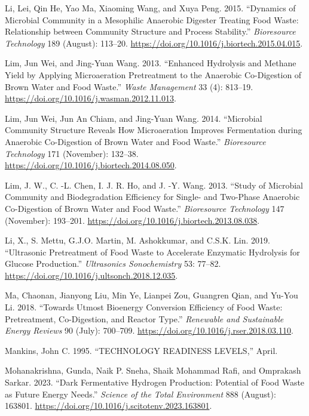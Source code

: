 \documentclass[11pt]{report}
\begin{document}
\begin{hangparas}{1.5em}{1}
\hypertarget{citeproc_bib_item_31}{Li, Lei, Qin He, Yao Ma, Xiaoming Wang, and Xuya Peng. 2015. “Dynamics of Microbial Community in a Mesophilic Anaerobic Digester Treating Food Waste: Relationship between Community Structure and Process Stability.” \textit{Bioresource Technology} 189 (August): 113–20. \url{https://doi.org/10.1016/j.biortech.2015.04.015}.}

\hypertarget{citeproc_bib_item_32}{Lim, Jun Wei, and Jing-Yuan Wang. 2013. “Enhanced Hydrolysis and Methane Yield by Applying Microaeration Pretreatment to the Anaerobic Co-Digestion of Brown Water and Food Waste.” \textit{Waste Management} 33 (4): 813–19. \url{https://doi.org/10.1016/j.wasman.2012.11.013}.}

\hypertarget{citeproc_bib_item_33}{Lim, Jun Wei, Jun An Chiam, and Jing-Yuan Wang. 2014. “Microbial Community Structure Reveals How Microaeration Improves Fermentation during Anaerobic Co-Digestion of Brown Water and Food Waste.” \textit{Bioresource Technology} 171 (November): 132–38. \url{https://doi.org/10.1016/j.biortech.2014.08.050}.}

\hypertarget{citeproc_bib_item_34}{Lim, J. W., C. -L. Chen, I. J. R. Ho, and J. -Y. Wang. 2013. “Study of Microbial Community and Biodegradation Efficiency for Single- and Two-Phase Anaerobic Co-Digestion of Brown Water and Food Waste.” \textit{Bioresource Technology} 147 (November): 193–201. \url{https://doi.org/10.1016/j.biortech.2013.08.038}.}

\hypertarget{citeproc_bib_item_35}{Li, X., S. Mettu, G.J.O. Martin, M. Ashokkumar, and C.S.K. Lin. 2019. “Ultrasonic Pretreatment of Food Waste to Accelerate Enzymatic Hydrolysis for Glucose Production.” \textit{Ultrasonics Sonochemistry} 53: 77–82. \url{https://doi.org/10.1016/j.ultsonch.2018.12.035}.}

\hypertarget{citeproc_bib_item_36}{Ma, Chaonan, Jianyong Liu, Min Ye, Lianpei Zou, Guangren Qian, and Yu-You Li. 2018. “Towards Utmost Bioenergy Conversion Efficiency of Food Waste: Pretreatment, Co-Digestion, and Reactor Type.” \textit{Renewable and Sustainable Energy Reviews} 90 (July): 700–709. \url{https://doi.org/10.1016/j.rser.2018.03.110}.}

\hypertarget{citeproc_bib_item_37}{Mankins, John C. 1995. “TECHNOLOGY READINESS LEVELS,” April.}

\hypertarget{citeproc_bib_item_38}{Mohanakrishna, Gunda, Naik P. Sneha, Shaik Mohammad Rafi, and Omprakash Sarkar. 2023. “Dark Fermentative Hydrogen Production: Potential of Food Waste as Future Energy Needs.” \textit{Science of the Total Environment} 888 (August): 163801. \url{https://doi.org/10.1016/j.scitotenv.2023.163801}.}


\end{hangparas}
\end{document}
